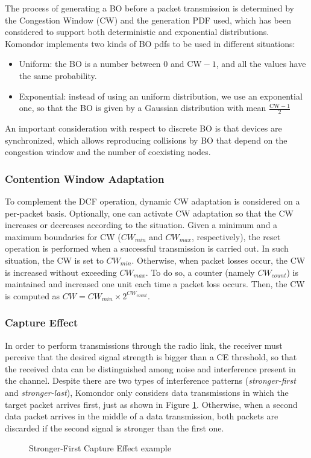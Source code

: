 \documentclass[a4paper]{article}
\begin{document}
		The process of generating a BO before a packet transmission is determined by the Congestion Window (CW) and the generation PDF used, which has been considered to support both deterministic and exponential distributions. Komondor implements two kinds of BO pdfs to be used in different situations:
		\begin{itemize}
			\item Uniform: the BO is a number between 0 and $\text{CW}-1$, and all the values have the same probability.
			\item Exponential: instead of using an uniform distribution, we use an exponential one, so that the BO is given by a Gaussian distribution with mean $\frac{\text{CW}-1}{2}$
		\end{itemize}
				
		An important consideration with respect to discrete BO is that devices are synchronized, which allows reproducing collisions by BO that depend on the congestion window and the number of coexisting nodes.
		
		\subsubsection{Contention Window Adaptation}
		\label{section:cw_adaptation}
		To complement the DCF operation, dynamic CW adaptation is considered on a per-packet basis. Optionally, one can activate CW adaptation so that the CW increases or decreases according to the situation. Given a minimum and a maximum boundaries for CW ($CW_{min}$ and $CW_{max}$, respectively), the reset operation is performed when a successful transmission is carried out. In such situation, the CW is set to $CW_{min}$. Otherwise, when packet losses occur, the CW is increased without exceeding $CW_{max}$. To do so, a counter (namely $CW_{count}$) is maintained and increased one unit each time a packet loss occurs. Then, the CW is computed as $CW = CW_{min} \times 2^{CW_{count}}$.
		
		\subsubsection{Capture Effect}
		\label{section:capture_effect}
		In order to perform transmissions through the radio link, the receiver must perceive that the desired signal strength is bigger than a CE threshold, so that the received data can be distinguished among noise and interference present in the channel. Despite there are two types of interference patterns (\emph{stronger-first} and \emph{stronger-last}), Komondor only considers data transmissions in which the target packet arrives first, just as shown in Figure \ref{fig:capture_effect}. Otherwise, when a second data packet arrives in the middle of a data transmission, both packets are discarded if the second signal is stronger than the first one.
		\begin{figure}[h!]
			\centering
			\caption{Stronger-First Capture Effect example}
			\label{fig:capture_effect}
		\end{figure}
	
\end{document}
